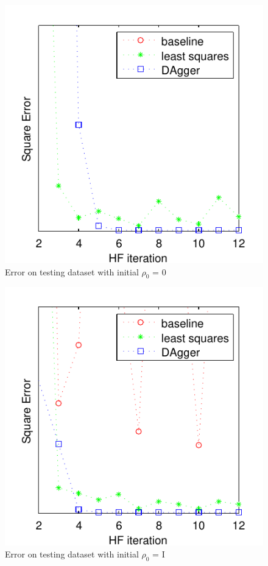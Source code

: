 \documentclass[twoside,11pt]{article}
\begin{document}
\begin{figure}[h!]
\center
  \caption{Error on testing dataset with initial $\rho_0$ = 0}
	\label{fig:testZero}
    \includegraphics{testcombpent3eneNOF.pdf}
\end{figure}

\begin{figure}[h!]
\center
  \caption{Error on testing dataset with initial $\rho_0$ = I}
  \label{fig:testEye}
    \includegraphics{eyeTest_testset6iter_noytick.pdf}
\end{figure}
\end{document}
